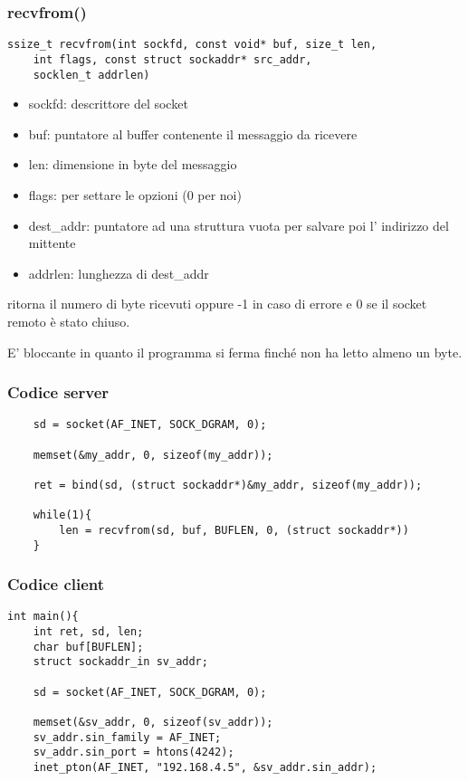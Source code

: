 {{{{{{{\subsubsection{recvfrom()}
\begin{verbatim}
ssize_t recvfrom(int sockfd, const void* buf, size_t len,
    int flags, const struct sockaddr* src_addr,
    socklen_t addrlen)
\end{verbatim}
\begin{itemize}
    \item sockfd: descrittore del socket
    \item buf: puntatore al buffer contenente il messaggio da ricevere
    \item len: dimensione in byte del messaggio
    \item flags: per settare le opzioni (0 per noi)
    \item dest\_addr: puntatore ad una struttura vuota per salvare poi l' indirizzo del mittente
    \item addrlen: lunghezza di dest\_addr
\end{itemize}
ritorna il numero di byte ricevuti oppure -1 in caso di errore e 0 se il socket remoto è stato chiuso.

E' bloccante in quanto il programma si ferma finché non ha letto almeno un byte.

\subsubsection{Codice server}
\begin{verbatim}
    sd = socket(AF_INET, SOCK_DGRAM, 0);
    
    memset(&my_addr, 0, sizeof(my_addr));
    
    ret = bind(sd, (struct sockaddr*)&my_addr, sizeof(my_addr));
    
    while(1){
        len = recvfrom(sd, buf, BUFLEN, 0, (struct sockaddr*))
    }
\end{verbatim}

\subsubsection{Codice client}
\begin{verbatim}
int main(){
    int ret, sd, len;
    char buf[BUFLEN];
    struct sockaddr_in sv_addr;
    
    sd = socket(AF_INET, SOCK_DGRAM, 0);
    
    memset(&sv_addr, 0, sizeof(sv_addr));
    sv_addr.sin_family = AF_INET;
    sv_addr.sin_port = htons(4242);
    inet_pton(AF_INET, "192.168.4.5", &sv_addr.sin_addr);
    

\end{verbatim}}}}}}}}
